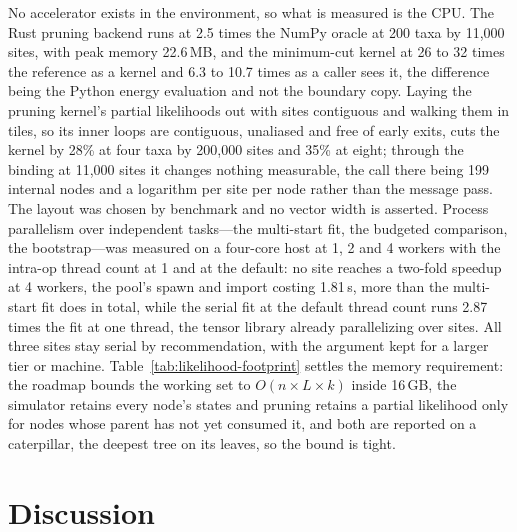 \documentclass[11pt,a4paper]{article}
\begin{document}
No accelerator exists in the environment, so what is measured is the CPU. The
Rust pruning backend runs at 2.5 times the NumPy oracle at 200 taxa by 11,000
sites, with peak memory 22.6\,MB, and the minimum-cut kernel at 26 to 32 times
the reference as a kernel and 6.3 to 10.7 times as a caller sees it, the
difference being the Python energy evaluation and not the boundary copy. Laying
the pruning kernel's partial likelihoods out with sites contiguous and walking
them in tiles, so its inner loops are contiguous, unaliased and free of early
exits, cuts the kernel by 28\% at four taxa by 200,000 sites and 35\% at eight;
through the binding at 11,000 sites it changes nothing measurable, the call
there being 199 internal nodes and a logarithm per site per node rather than
the message pass. The layout was chosen by benchmark and no vector width is
asserted.
Process parallelism over independent tasks---the multi-start fit, the
budgeted comparison, the bootstrap---was measured on a four-core host at 1, 2
and 4 workers with the intra-op thread count at 1 and at the default: no
site reaches a two-fold speedup at 4 workers, the pool's spawn and import
costing 1.81\,s, more than the multi-start fit does in total, while the
serial fit at the default thread count runs 2.87 times the fit at one thread,
the tensor library already parallelizing over sites. All three sites stay
serial by recommendation, with the argument kept for a larger tier or machine.
Table~\ref{tab:likelihood-footprint} settles the memory requirement: the
roadmap bounds the working set to $O(n \times L \times k)$ inside 16\,GB, the
simulator retains every node's states and pruning retains a partial likelihood
only for nodes whose parent has not yet consumed it, and both are reported on a
caterpillar, the deepest tree on its leaves, so the bound is tight.

\begin{table}[htbp]
  \centering
  
  \caption{\likelihoodFootprintCaption}
  \label{tab:likelihood-footprint}
\end{table}

\section{Discussion}
\label{sec:discussion}
\end{document}
